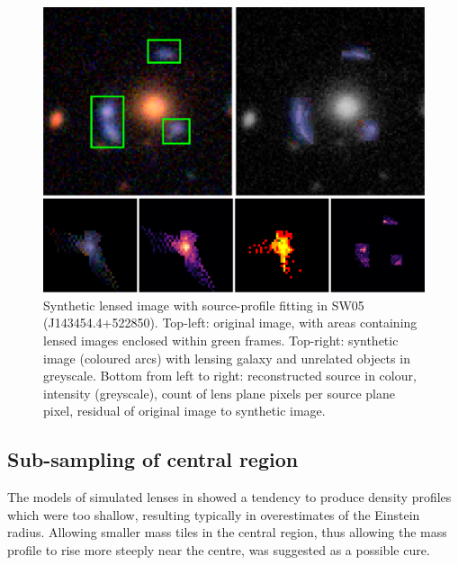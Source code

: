 \begin{figure}
  \includegraphics[width=\linewidth]{img/new_synth_img_detailed}
  \caption{Synthetic lensed image with source-profile fitting in SW05
    (J143454.4+522850). Top-left: original image, with areas
    containing lensed images enclosed within green frames.  Top-right:
    synthetic image (coloured arcs) with lensing galaxy and unrelated
    objects in greyscale.  Bottom from left to right: reconstructed
    source in colour, intensity (greyscale), count of lens plane
    pixels per source plane pixel, residual of original image to
    synthetic image.}
  \label{fig:synthimg}
\end{figure}

\subsection{Sub-sampling of central region}\label{subsec:hires}

The models of simulated lenses in \cite{2015MNRAS.447.2170K} showed a tendency 
to produce density profiles which were too shallow, resulting typically
in overestimates of the Einstein radius.
Allowing smaller mass tiles in the
central region, thus allowing the mass profile to rise more steeply
near the centre, was suggested as a possible cure.

